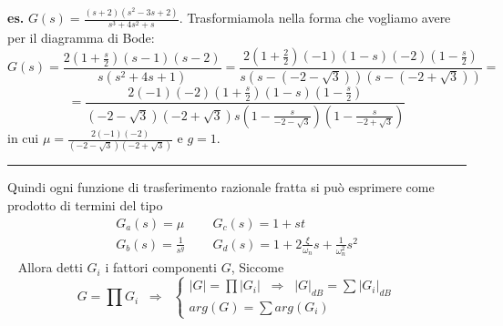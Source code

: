 \newline
\textbf{es.} $G(s) = \frac{(s+2)(s^2-3s+2)}{s^3 + 4 s^2 + s}$.\newline
Trasformiamola nella forma che vogliamo avere per il diagramma di Bode:
\[
    G(s) = \frac{2(1+\frac{s}{2})(s-1)(s-2)}{s(s^2+4s+1)} = \frac{2(1+ \frac{2}{2})(-1)(1-s)(-2)(1-\frac{s}{2})}{s(s-(-2-\sqrt{3}))(s-(-2+\sqrt{3}))}=
\]
\[
    = \frac{2(-1)(-2)(1+\frac{s}{2})(1-s)(1-\frac{s}{2})}{(-2-\sqrt{3})(-2+\sqrt{3})s(1-\frac{s}{-2-\sqrt{3}})(1-\frac{s}{-2+\sqrt{3}})}
\]
in cui $\mu= \frac{2(-1)(-2)}{(-2-\sqrt{3})(-2+\sqrt{3})}$ e $g=1$.\newline
\rule{\textwidth}{0,4pt}
\newline
\newline
Quindi ogni funzione di trasferimento razionale fratta si può esprimere come prodotto di termini del tipo 
\[
    \begin{matrix}
        G_a(s) = \mu & \;\; & G_c(s) = 1+ s t\\
        G_b(s) = \frac{1}{s^g} & \;\; & G_d(s) = 1 + 2 \frac{\xi}{\omega_n}s + \frac{1}{\omega_n^2}s^2
    \end{matrix}
\]
\ \newline
\newline
Allora detti $G_i$ i fattori componenti $G$, Siccome
\[
    G=\prod G_i \;\; \Longrightarrow \;\; \begin{cases}
        |G| = \prod |G_i| \;\; \Longrightarrow \;\; |G|_{dB} = \sum |G_i|_{dB}\\
        arg(G) = \sum arg(G_i)
    \end{cases}
\]
